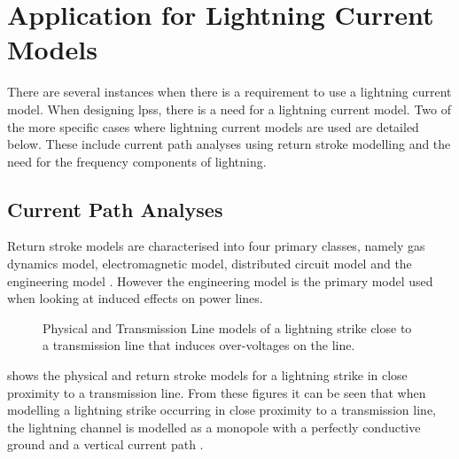
\section{Application for Lightning Current Models}
\label{sec:background_applications}
There are several instances when there is a requirement to use a lightning current model. When designing \glspl{lps}, there is a need for a lightning current model. Two of the more specific cases where lightning current models are used are detailed below. These include current path analyses using return stroke modelling and the need for the frequency components of lightning.
\subsection{Current Path Analyses}
\label{sub:background_lemp}
Return stroke models are characterised into four primary classes, namely gas dynamics model, electromagnetic model, distributed circuit model and the engineering model \cite{Paolone2009,Rakov2003,Rakov2009}. However the engineering model is the primary model used when looking at induced effects on power lines.

\begin{figure}[htbp]
    \centering
    \caption[]{ Physical and  Transmission Line models of a lightning strike close to a transmission line that induces over-voltages on the line.}
    \label{fig:induced_voltage_models}
\end{figure}
 shows the  physical and  return stroke models for a lightning strike in close proximity to a transmission line. From these figures it can be seen that when modelling a lightning strike occurring in close proximity to a transmission line, the lightning channel is modelled as a monopole with a perfectly conductive ground and a vertical current path \cite{Paolone2009,Baba2007,McAfee2015}.

